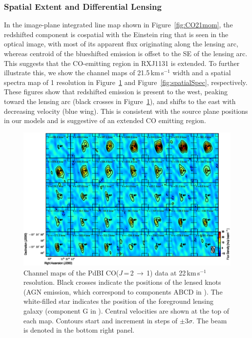 \documentclass[]{emulateapj}
\newcommand{\rarr}{$\rightarrow$}
\newcommand{\bco}{\mbox{CO($J$\,=\,2\,\rarr\,1)}\xspace}
\newcommand{\kms}{\mbox{km\,s$^{-1}$}\xspace}
\newcommand{\Fig}[1]{Figure~\ref{fig:#1}}
\begin{document}
\subsubsection{Spatial Extent and Differential Lensing} \label{sec:differential}
In the image-plane integrated line map shown in \Fig{CO21mom}, the redshifted component is
cospatial with the Einstein ring that is seen in the
optical image, with most of its apparent flux originating along the lensing arc,
whereas centroid of the blueshifted emission is offset to the SE of
the lensing arc. This suggests that the CO-emitting region in RXJ1131 is extended.
To further illustrate this, we show the
channel maps of 21.5\,\kms width and a spatial spectra map of 1 resolution in
\Fig{chanmap} and \Fig{spatialSpec}, respectively. These figures
show that redshifted emission
is present to the west, peaking toward the lensing arc (black crosses in
\Fig{chanmap}), and shifts to the east with decreasing velocity
(blue wing).
This is consistent with the source plane positions in our models and
is suggestive of an extended CO emitting region.

\begin{figure}[!htbp]
\centering
\includegraphics[width=1.0\textwidth]{f7.eps}
\caption{
Channel maps of the PdBI \bco data at 22\,\kms resolution.
Black crosses indicate the positions of the lensed knots (AGN emission,
which correspond to components ABCD in ). The white-filled
star indicates the position of the foreground lensing galaxy (component G
in ).
Central velocities are shown at the top of each map.
Contours start and increment in steps of
$\pm$3$\sigma$. The beam is denoted in the bottom right panel. \label{fig:chanmap}}
\end{figure}
\end{document}
